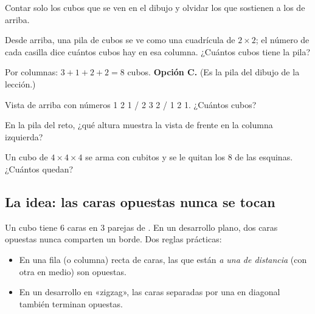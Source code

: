 \begin{trampa}
Contar solo los cubos que se ven en el dibujo y olvidar los que sostienen a los de arriba.
\end{trampa}

\begin{reto}
Desde arriba, una pila de cubos se ve como una cuadrícula de $2 \times 2$; el número de cada casilla dice cuántos cubos hay
en esa columna. ¿Cuántos cubos tiene la pila?
\begin{center}\end{center}
\end{reto}

\begin{retoresuelto}
Por columnas: $3 + 1 + 2 + 2 = 8$ cubos. \textbf{Opción C.} (Es la pila del dibujo de la lección.)
\end{retoresuelto}

\taller
{}
\begin{ejercicios}
\item Vista de arriba con números 1 2 1 / 2 3 2 / 1 2 1. ¿Cuántos cubos? 
\item En la pila del reto, ¿qué altura muestra la vista de frente en la columna izquierda? 
\end{ejercicios}
\begin{ejercicios}
\item Un cubo de $4 \times 4 \times 4$ se arma con cubitos y se le quitan los 8 de las esquinas. ¿Cuántos quedan?
\end{ejercicios}

\bitacora


\subsection{La idea: las caras opuestas nunca se tocan}
Un cubo tiene 6 caras en 3 parejas de . En un desarrollo plano, dos caras opuestas nunca comparten un
borde. Dos reglas prácticas:
\begin{itemize}
  \item En una fila (o columna) recta de caras, las que están \emph{a una de distancia} (con otra en medio) son opuestas.
  \item En un desarrollo en «zigzag», las caras separadas por una en diagonal también terminan opuestas.
\end{itemize}

